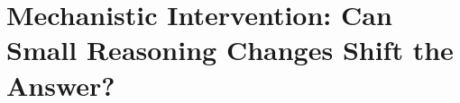\documentclass[11pt]{article}
\begin{document}



\section{Mechanistic Intervention: Can Small Reasoning Changes Shift the Answer?}
\label{sec:mechanistic_intervention}
\end{document}
